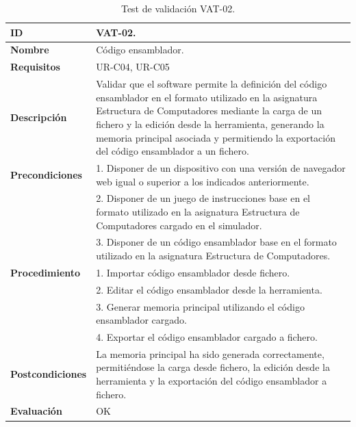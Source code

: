 \begin{center}
\begin{table}[htbp]
\centering
\caption{Test de validación VAT-02.}
\begin{tabular}{@{}p{2.5cm} p{13cm}@{}} 
\toprule
\textbf{ID} 					& VAT-02. \\
\midrule
\textbf{Nombre} 				& Código \gls{ensamblador}. \\
\midrule
\textbf{Requisitos} 		& UR-C04, UR-C05 \\
\midrule
\textbf{Descripción} 		& Validar que el \gls{software} permite la definición del código \gls{ensamblador} en el formato utilizado en la asignatura Estructura de Computadores mediante la carga de un fichero y la edición desde la herramienta, generando la memoria principal asociada y permitiendo la exportación del código \gls{ensamblador} a un fichero. \\
\midrule
\textbf{Precondiciones}		& 1. Disponer de un dispositivo con una versión de navegador web igual o superior a los indicados anteriormente. \\
											& 2. Disponer de un juego de instrucciones base en el formato utilizado en la asignatura Estructura de Computadores cargado en el simulador. \\
											& 3. Disponer de un código \gls{ensamblador} base en el formato utilizado en la asignatura Estructura de Computadores. \\
\midrule
\textbf{Procedimiento}		& 1. Importar código \gls{ensamblador} desde fichero.\\
											& 2. Editar el código \gls{ensamblador} desde la herramienta.\\
											& 3. Generar memoria principal utilizando el código \gls{ensamblador} cargado.\\
											& 4. Exportar el código \gls{ensamblador} cargado a fichero. \\
\midrule
\textbf{Postcondiciones} 		&  La memoria principal ha sido generada correctamente, permitiéndose la carga desde fichero, la edición desde la herramienta y la exportación del código \gls{ensamblador} a fichero.\\
\midrule
\textbf{Evaluación} 			& OK \\
\bottomrule
\end{tabular}
\label{tab:vat-02}
\end{table}
\end{center}

